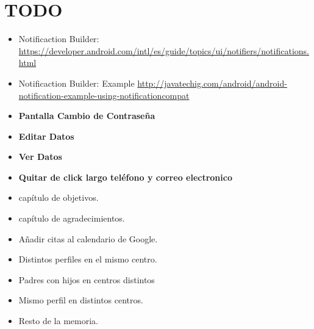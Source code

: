 %
%
%
%

\cleardoublepage
\chapter{TODO}
\label{chap:TODO}

\begin{itemize}
	\item Notificaction Builder: \url{https://developer.android.com/intl/es/guide/topics/ui/notifiers/notifications.html}
	\item Notificaction Builder: Example \url{http://javatechig.com/android/android-notification-example-using-notificationcompat}
	\item {\bf Pantalla Cambio de Contraseña}
	\item {\bf Editar Datos}
	\item {\bf Ver Datos}
	\item {\bf Quitar de click largo teléfono y correo electronico}
	\item capítulo de objetivos.
	\item capítulo de agradecimientos.
	\item Añadir citas al calendario de Google.
	\item Distintos perfiles en el mismo centro.
	\item Padres con hijos en centros distintos
	\item Mismo perfil en distintos centros.
	\item Resto de la memoria.
\end{itemize}